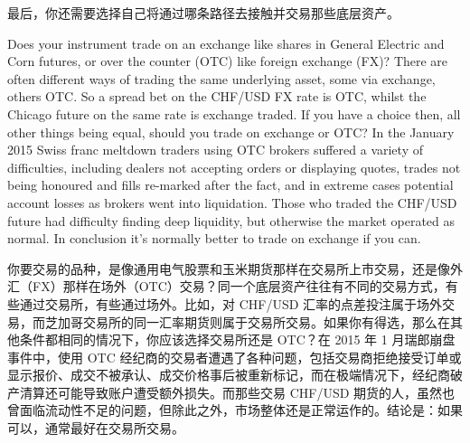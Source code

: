 \begin{chineseblock}最后，你还需要选择自己将通过哪条路径去接触并交易那些底层资产。\end{chineseblock}


\begin{englishblock} Does your instrument trade on an exchange like shares in General Electric and Corn futures, or over the counter (OTC) like foreign exchange (FX)? There are often different ways of trading the same underlying asset, some via exchange, others OTC. So a spread bet on the CHF/USD FX rate is OTC, whilst the Chicago future on the same rate is exchange traded. If you have a choice then, all other things being equal, should you trade on exchange or OTC? In the January 2015 Swiss franc meltdown traders using OTC brokers suffered a variety of difficulties, including dealers not accepting orders or displaying quotes, trades not being honoured and fills re-marked after the fact, and in extreme cases potential account losses as brokers went into liquidation. Those who traded the CHF/USD future had difficulty finding deep liquidity, but otherwise the market operated as normal. In conclusion it's normally better to trade on exchange if you can. \end{englishblock}

\begin{chineseblock}你要交易的品种，是像通用电气股票和玉米期货那样在交易所上市交易，还是像外汇（FX）那样在场外（OTC）交易？同一个底层资产往往有不同的交易方式，有些通过交易所，有些通过场外。比如，对 CHF/USD 汇率的点差投注属于场外交易，而芝加哥交易所的同一汇率期货则属于交易所交易。如果你有得选，那么在其他条件都相同的情况下，你应该选择交易所还是 OTC？在 2015 年 1 月瑞郎崩盘事件中，使用 OTC 经纪商的交易者遭遇了各种问题，包括交易商拒绝接受订单或显示报价、成交不被承认、成交价格事后被重新标记，而在极端情况下，经纪商破产清算还可能导致账户遭受额外损失。而那些交易 CHF/USD 期货的人，虽然也曾面临流动性不足的问题，但除此之外，市场整体还是正常运作的。结论是：如果可以，通常最好在交易所交易。\end{chineseblock}


